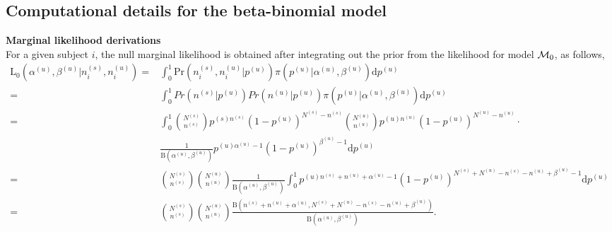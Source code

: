 \documentclass{article}
\begin{document}
\subsection{Computational details for the beta-binomial model}
\noindent\textbf{Marginal likelihood derivations}\\
For a given subject $i$, the null marginal likelihood is obtained after integrating out the prior from the likelihood for model ${\cal M}_0$, as follows,
\[
\begin{split}
\mathrm{L_0}(\alpha^{(u)},\beta^{(u)}|n^{(s)}_{i},n^{(u)}_{i}) =&\int_0^1 \mathrm{Pr}(n^{(s)}_{i},n^{(u)}_{i}|p^{(u)})\pi(p^{(u)}|\alpha^{(u)},\beta^{(u)})\mathrm{d}p^{(u)}\\
=& \int_0^1Pr(n^{(s)}|p^{(u)})Pr(n^{(u)}|p^{(u)})\pi(p^{(u)}|\alpha^{(u)},\beta^{(u)}) \mathrm{d}p^{(u)}\\
=&\int_0^1\binom{N^{(s)}}{n^{(s)}}p^{(s)n^{(s)}}(1-p^{(u)})^{N^{(s)}-n^{(s)}}\binom{N^{(u)}}{n^{(u)}}p^{(u)n^{(u)}}(1-p^{(u)})^{N^{(u)}-n^{(u)}}\cdot \\&\frac{1}{\mathrm{B}(\alpha^{(u)},\beta^{(u)})}p^{(u)\alpha^{(u)}-1}(1-p^{(u)})^{\beta^{(u)}-1} \mathrm{d}p^{(u)}\\
=&\binom{N^{(s)}}{n^{(s)}}\binom{N^{(u)}}{n^{(u)}}\frac{1}{\mathrm{B}(\alpha^{(u)},\beta^{(u)})}\int_0^1 p^{(u)n^{(s)}+n^{(u)}+\alpha^{(u)}-1}(1-p^{(u)})^{N^{(s)}+N^{(u)}-n^{(s)}-n^{(u)}+\beta^{(u)}-1} \mathrm{d}p^{(u)}\\
=&\binom{N^{(s)}}{n^{(s)}}\binom{N^{(u)}}{n^{(u)}}\frac{\mathrm{B}(n^{(s)}+n^{(u)}+\alpha^{(u)},N^{(s)}+N^{(u)}-n^{(s)}-n^{(u)}+\beta^{(u)})}{\mathrm{B}(\alpha^{(u)},\beta^{(u)})}.
\end{split}
\]
\end{document}
